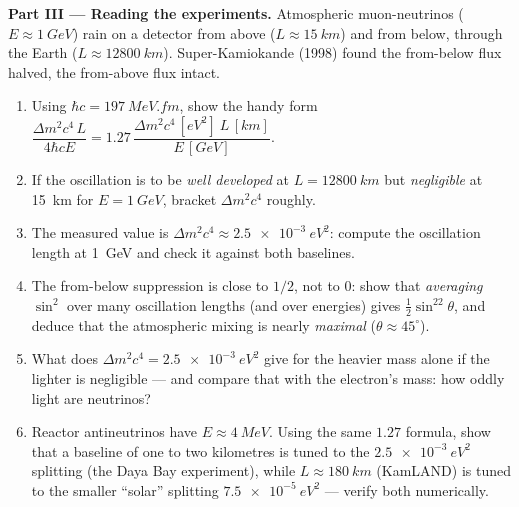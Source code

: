 \begin{problem}
\medskip\noindent\textbf{Part III --- Reading the experiments.}
Atmospheric muon-neutrinos ($E \approx \qty{1}{GeV}$) rain on a
detector from above ($L \approx \qty{15}{km}$) and from below,
through the Earth ($L \approx \qty{12800}{km}$). Super-Kamiokande
(1998) found the from-below flux halved, the from-above flux intact.
\begin{enumerate}[resume]
  \item Using $\hbar c = \qty{197}{MeV.fm}$, show the handy form
        $\dfrac{\Delta m^2c^4\,L}{4\hbar cE} = 1.27\,
        \dfrac{\Delta m^2c^4\,[\unit{eV^2}]\ L\,[\unit{km}]}
        {E\,[\unit{GeV}]}$.
  \item If the oscillation is to be \emph{well developed} at $L =
        \qty{12800}{km}$ but \emph{negligible} at \qty{15}{km} for
        $E = \qty{1}{GeV}$, bracket $\Delta m^2c^4$ roughly.
  \item The measured value is $\Delta m^2c^4 \approx
        \qty{2.5e-3}{eV^2}$: compute the oscillation length at
        \qty{1}{GeV} and check it against both baselines.
  \item The from-below suppression is close to $1/2$, not to $0$:
        show that \emph{averaging} $\sin^2$ over many oscillation
        lengths (and over energies) gives $\tfrac12\sin^22\theta$,
        and deduce that the atmospheric mixing is nearly
        \emph{maximal} ($\theta \approx 45^\circ$).
  \item What does $\Delta m^2c^4 = \qty{2.5e-3}{eV^2}$ give for the
        heavier mass alone if the lighter is negligible --- and
        compare that with the electron's mass: how oddly light are
        neutrinos?
  \item Reactor antineutrinos have $E \approx \qty{4}{MeV}$. Using
        the same $1.27$ formula, show that a baseline of one to two
        kilometres is tuned to the $\qty{2.5e-3}{eV^2}$ splitting
        (the Daya Bay experiment), while $L \approx \qty{180}{km}$
        (KamLAND) is tuned to the smaller ``solar'' splitting
        $\qty{7.5e-5}{eV^2}$ --- verify both numerically.
\end{enumerate}


\end{problem}
